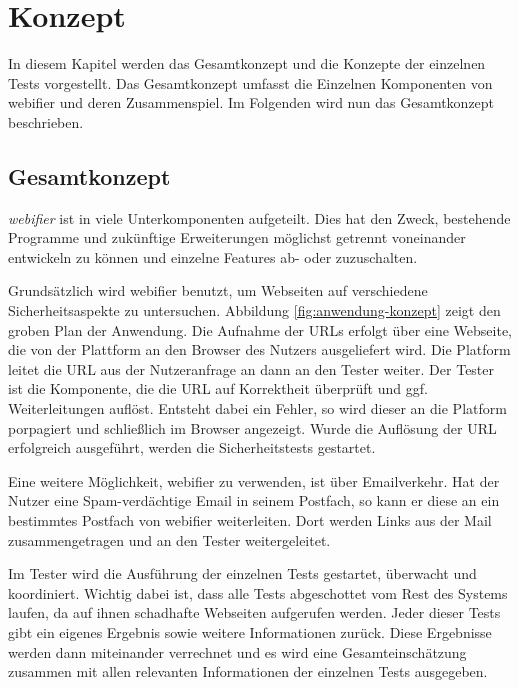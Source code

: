 \chapter{Konzept}

In diesem Kapitel werden das Gesamtkonzept und die Konzepte der einzelnen Tests vorgestellt. Das Gesamtkonzept umfasst die Einzelnen Komponenten von webifier und deren Zusammenspiel. Im Folgenden wird nun das Gesamtkonzept beschrieben.

\section{Gesamtkonzept}

\textit{webifier} ist in viele Unterkomponenten aufgeteilt.
Dies hat den Zweck, bestehende Programme und zukünftige Erweiterungen möglichst getrennt voneinander entwickeln zu können und einzelne Features ab- oder zuzuschalten.


Grundsätzlich wird webifier benutzt, um Webseiten auf verschiedene Sicherheitsaspekte zu untersuchen.
Abbildung \ref{fig:anwendung-konzept} zeigt den groben Plan der Anwendung.
Die Aufnahme der URLs erfolgt über eine Webseite, die von der Plattform an den Browser des Nutzers ausgeliefert wird.
Die Platform leitet die \ac{URL} aus der Nutzeranfrage an dann an den Tester weiter.
Der Tester ist die Komponente, die die \ac{URL} auf Korrektheit überprüft und ggf. Weiterleitungen auflöst.
Entsteht dabei ein Fehler, so wird dieser an die Platform porpagiert und schließlich im Browser angezeigt.
Wurde die Auflösung der \ac{URL} erfolgreich ausgeführt, werden die Sicherheitstests gestartet.

Eine weitere Möglichkeit, webifier zu verwenden, ist über Emailverkehr.
Hat der Nutzer eine Spam-verdächtige Email in seinem Postfach, so kann er diese an ein bestimmtes Postfach von webifier weiterleiten.
Dort werden Links  aus der Mail zusammengetragen und an den Tester weitergeleitet.

Im Tester wird die Ausführung der einzelnen Tests gestartet, überwacht und koordiniert.
Wichtig dabei ist, dass alle Tests abgeschottet vom Rest des Systems laufen, da auf ihnen
schadhafte Webseiten aufgerufen werden.
Jeder dieser Tests gibt ein eigenes Ergebnis sowie weitere Informationen zurück. Diese Ergebnisse
werden dann miteinander verrechnet und es wird eine Gesamteinschätzung zusammen mit allen
relevanten Informationen der einzelnen Tests ausgegeben.

